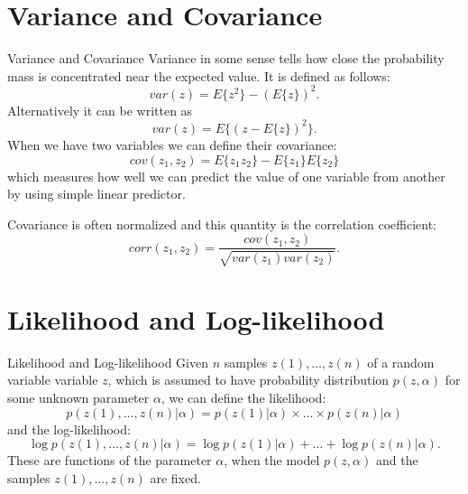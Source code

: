 \documentclass{beamer}
\begin{document}
\section{Variance and Covariance}

\begin{frame}{Variance and Covariance}
  Variance in some sense tells how close the probability mass is concentrated
  near the expected value. It is defined as follows:
  \[
  var(z)= E\{z^2\}-(E\{z\})^2.
  \]
  Alternatively it can be written as
  \[
   var(z) = E\{(z-E\{z\})^2\}.
  \]
  When we have two variables we can define their covariance:
  \[
  cov(z_1, z_2) = E\{z_1 z_2\} - E\{z_1\}E\{z_2\}
  \]
  which measures how well we can predict the value of one variable from another
  by using simple linear predictor.

  Covariance is often normalized and this quantity is the correlation
  coefficient:
  \[
  corr(z_1,z_2) = \frac{cov(z_1, z_2)}{\sqrt{var(z_1)var(z_2)}}.
  \]
\end{frame}

%

\section{Likelihood and Log-likelihood}

\begin{frame}{Likelihood and Log-likelihood}
  Given $n$ samples $z(1), \ldots , z(n)$ of a random variable variable $z$, which
  is assumed to have probability distribution $p(z, \alpha)$ for some unknown
  parameter $\alpha$, we can define the likelihood:
  \[
  p(z(1), \ldots , z(n)|\alpha) = p(z(1)|\alpha)\times \ldots \times p(z(n)|\alpha)
  \]
  and the log-likelihood:
  \[
  \log p(z(1), \ldots , z(n)|\alpha) = \log p(z(1)|\alpha) + \ldots + \log p(z(n)|\alpha).
  \]
  These are functions of the parameter $\alpha$, when the model $p(z, \alpha)$
  and the samples $z(1), \ldots , z(n)$ are fixed.
\end{frame}
\end{document}
